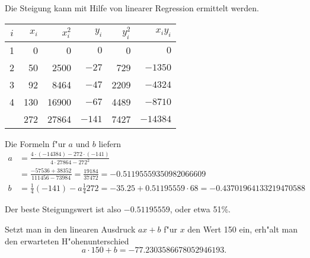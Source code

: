 \begin{loesung}
Die Steigung kann mit Hilfe von linearer Regression ermittelt werden.
\begin{center}
\begin{tabular}{|c|rr|rr|r|}
\hline
$i$&$x_i$&$x_i^2$&$y_i$&$y_i^2$&$x_iy_i$\\
\hline
1&  0&    0&$   0$&   0&$    0$\\
2& 50& 2500&$ -27$& 729&$ -1350$\\
3& 92& 8464&$ -47$&2209&$ -4324$\\
4&130&16900&$ -67$&4489&$ -8710$\\
\hline
 &272&27864&$-141$&7427&$-14384$\\
\hline
\end{tabular}
\end{center}
Die Formeln f"ur $a$ und $b$ liefern
\begin{align*}
a
&=\frac{4\cdot(-14384)-272\cdot (-141)}{4\cdot 27864 - 272^2}
\\
&=
\frac{-57536+38352}{111456-73984}
=
\frac{19184}{37472}=-0.51195559350982066609
\\
b
&=
\frac14(-141)-a\frac14272
=-35.25 + 0.51195559\cdot 68=-0.43701964133219470588
\end{align*}
\begin{teilaufgaben}
\item Der beste Steigungswert ist also $-0.51195559$, oder etwa 51\%.
\item Setzt man in den linearen Ausdruck $ax+b$ f"ur $x$ den Wert
150 ein, erh"alt man den erwarteten H"ohenunterschied
\[
a\cdot 150 + b= 
-77.2303586678052946193.
\]
\end{teilaufgaben}
\end{loesung}

